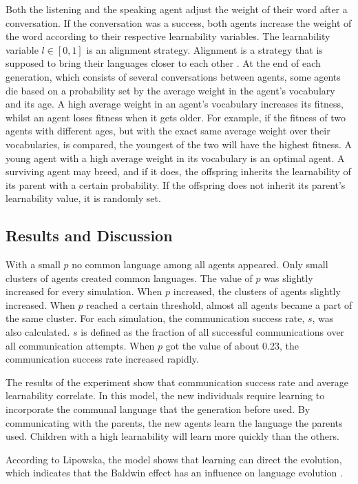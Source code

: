 Both the listening and the speaking agent adjust the weight of their word after a conversation. If the conversation was a success, both agents increase the weight of the word according to their respective learnability variables. The learnability variable $ l \in [0, 1]$ is an alignment strategy. Alignment is a strategy that is supposed to bring their languages closer to each other \citep{steels2012experiments}. At the end of each generation, which consists of several conversations between agents, some agents die based on a probability set by the average weight in the agent's vocabulary and its age. A high average weight in an agent's vocabulary increases its fitness, whilst an agent loses fitness when it gets older. For example, if the fitness of two agents with different ages, but with the exact same average weight over their vocabularies, is compared, the youngest of the two will have the highest fitness. A young agent with a high average weight in its vocabulary is an optimal agent. A surviving agent may breed, and if it does, the offspring inherits the learnability of its parent with a certain probability. If the offspring does not inherit its parent's learnability value, it is randomly set.

\subsection{Results and Discussion}
With a small $p$ no common language among all agents appeared. Only small clusters of agents created common languages. The value of $p$ was slightly increased for every simulation. When $p$ increased, the clusters of agents slightly increased. When $p$ reached a certain threshold, almost all agents became a part of the same cluster. For each simulation, the communication success rate, $s$, was also calculated. $s$ is defined as the fraction of all successful communications over all communication attempts. When $p$ got the value of about 0.23, the communication success rate increased rapidly. 

The results of the experiment show that communication success rate and average learnability correlate. In this model, the new individuals require learning to incorporate the communal language that the generation before used. By communicating with the parents, the new agents learn the language the parents used. Children with a high learnability will learn more quickly than the others. 

According to Lipowska, the model shows that learning can direct the evolution, which indicates that the Baldwin effect has an influence on language evolution \citep[Section 4]{lipowska2011naming}.

